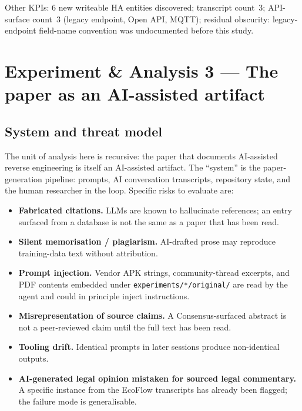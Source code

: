 \documentclass[11pt,a4paper]{article}
\begin{document}
Other KPIs: 6 new writeable HA entities discovered; transcript count~3;
API-surface count~3 (legacy endpoint, Open API, MQTT); residual obscurity:
legacy-endpoint field-name convention was undocumented before this study.

\section{Experiment \& Analysis 3 --- The paper as an AI-assisted artifact}
\label{sec:case-meta}

\subsection{System and threat model}
\label{sec:meta-threat-model}
The unit of analysis here is recursive: the paper that documents AI-assisted
reverse engineering is itself an AI-assisted artifact. The ``system'' is the
paper-generation pipeline: prompts, AI conversation transcripts, repository
state, and the human researcher in the loop. Specific risks to evaluate are:
\begin{itemize}
  \item \textbf{Fabricated citations.} LLMs are known to hallucinate
        references; an entry surfaced from a database is not the same as a
        paper that has been read.
  \item \textbf{Silent memorisation / plagiarism.} AI-drafted prose may
        reproduce training-data text without attribution.
  \item \textbf{Prompt injection.} Vendor APK strings, community-thread
        excerpts, and PDF contents embedded under
        \texttt{experiments/*/original/} are read by the agent and could in
        principle inject instructions.
  \item \textbf{Misrepresentation of source claims.} A Consensus-surfaced
        abstract is not a peer-reviewed claim until the full text has been
        read.
  \item \textbf{Tooling drift.} Identical prompts in later sessions produce
        non-identical outputs.
  \item \textbf{AI-generated legal opinion mistaken for sourced legal
        commentary.} A specific instance from the EcoFlow transcripts has
        already been flagged; the failure mode is generalisable.
\end{itemize}
\end{document}
